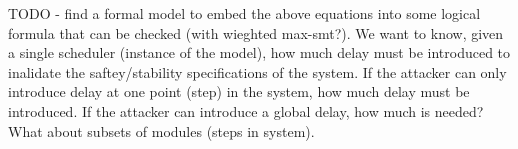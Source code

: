 TODO - find a formal model to embed the above equations into some logical formula that can be checked (with wieghted max-smt?).
We want to know, given a single scheduler (instance of the model), how much delay must be introduced to inalidate the saftey/stability specifications of the system. If the attacker can only introduce delay at one point (step) in the system, how much delay must be introduced. If the attacker can introduce a global delay, how much is needed? What about subsets of modules (steps in system).
